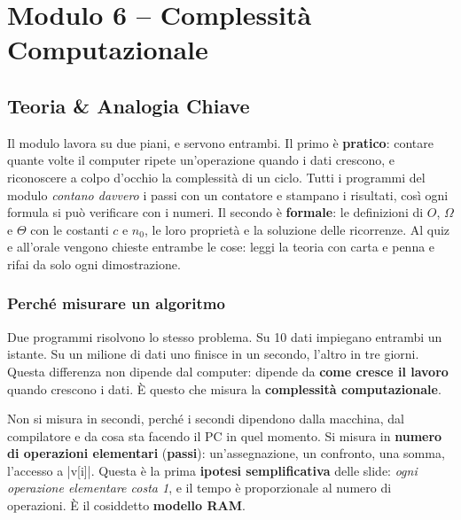 \chapter{Modulo 6 -- Complessità Computazionale}

\section{Teoria \& Analogia Chiave}

\begin{consiglio}
Il modulo lavora su due piani, e servono entrambi. Il primo è \textbf{pratico}:
contare quante volte il computer ripete un'operazione quando i dati crescono, e
riconoscere a colpo d'occhio la complessità di un ciclo. Tutti i programmi del modulo
\emph{contano davvero} i passi con un contatore e stampano i risultati, così ogni
formula si può verificare con i numeri. Il secondo è \textbf{formale}: le definizioni
di $O$, $\Omega$ e $\Theta$ con le costanti $c$ e $n_0$, le loro proprietà e la
soluzione delle ricorrenze. Al quiz e all'orale vengono chieste entrambe le cose:
leggi la teoria con carta e penna e rifai da solo ogni dimostrazione.
\end{consiglio}

\subsection*{Perché misurare un algoritmo}

Due programmi risolvono lo stesso problema. Su 10 dati impiegano entrambi un
istante. Su un milione di dati uno finisce in un secondo, l'altro in tre giorni.
Questa differenza non dipende dal computer: dipende da \textbf{come cresce il
lavoro} quando crescono i dati. È questo che misura la \textbf{complessità
computazionale}.

Non si misura in secondi, perché i secondi dipendono dalla macchina, dal
compilatore e da cosa sta facendo il PC in quel momento. Si misura in
\textbf{numero di operazioni elementari} (\textbf{passi}): un'assegnazione, un
confronto, una somma, l'accesso a \cc|v[i]|. Questa è la prima \textbf{ipotesi
semplificativa} delle slide: \emph{ogni operazione elementare costa 1}, e il
tempo è proporzionale al numero di operazioni. È il cosiddetto \textbf{modello RAM}.

